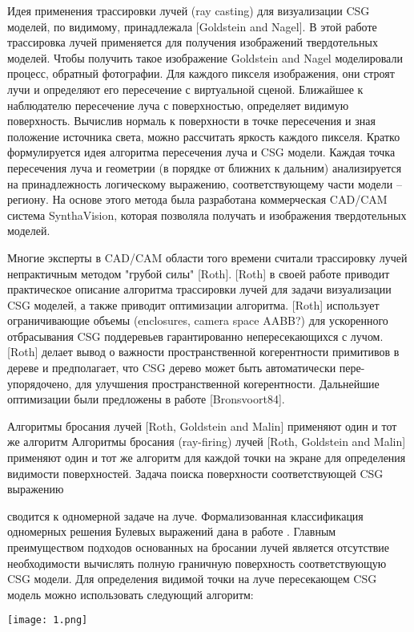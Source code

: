 Идея применения трассировки лучей (ray casting) для визуализации CSG моделей, по видимому, принадлежала [Goldstein and Nagel]. В этой работе трассировка лучей применяется для получения  изображений твердотельных моделей. Чтобы получить такое изображение Goldstein and Nagel моделировали процесс, обратный фотографии. Для каждого пикселя изображения, они строят лучи и определяют его пересечение с виртуальной сценой. Ближайшее к наблюдателю пересечение луча с поверхностью, определяет видимую поверхность. Вычислив нормаль к поверхности в точке пересечения и зная положение источника света, можно рассчитать яркость каждого пикселя. Кратко формулируется идея алгоритма пересечения луча и CSG модели. Каждая точка пересечения луча и геометрии (в порядке от ближних к дальним) анализируется на принадлежность логическому выражению, соответствующему части модели -- региону. На основе этого метода была разработана коммерческая CAD/CAM система SynthaVision, которая позволяла получать  и  изображения твердотельных моделей.

Многие эксперты в CAD/CAM области того времени считали трассировку лучей непрактичным методом "грубой силы" [Roth]. [Roth] в своей работе приводит практическое описание алгоритма трассировки лучей для задачи визуализации CSG моделей, а также приводит оптимизации алгоритма. [Roth] использует ограничивающие объемы (enclosures, camera space AABB?) для ускоренного отбрасывания CSG поддеревьев гарантированно непересекающихся с лучом. [Roth] делает вывод о важности пространственной когерентности примитивов в дереве и предполагает, что CSG дерево может быть автоматически пере-упорядочено, для улучшения пространственной когерентности. Дальнейшие оптимизации были предложены в работе [Bronsvoort84].

Алгоритмы бросания лучей [Roth, Goldstein and Malin] применяют один и тот же алгоритм 
Алгоритмы бросания (ray-firing) лучей [Roth, Goldstein and Malin] применяют один и тот же алгоритм для каждой точки на экране для определения видимости поверхностей. Задача поиска поверхности соответствующей CSG выражению {сводится к одномерной задаче на луче. Формализованная классификация одномерных  решения Булевых выражений дана в работе . Главным преимуществом подходов основанных на бросании лучей является отсутствие необходимости вычислять полную граничную поверхность соответствующую CSG модели. Для определения видимой точки на луче пересекающем CSG модель можно использовать следующий алгоритм:

\texttt{[image: 1.png]}}


